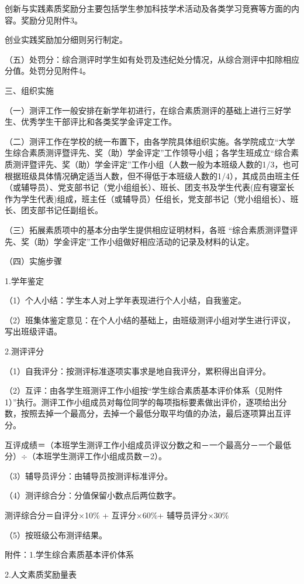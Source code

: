 \documentclass[UTF8,12pt,a4paper]{report}
\begin{document}
创新与实践素质奖励分主要包括学生参加科技学术活动及各类学习竞赛等方面的内容。奖励分见附件3。

创业实践奖励加分细则另行制定。

（五）处罚分：综合测评时学生如有处罚及违纪处分情况，从综合测评中扣除相应分值。处罚分见附件4。

三、组织实施

（一）测评工作一般安排在新学年初进行，在综合素质测评的基础上进行三好学生、优秀学生干部评比和各类奖学金评定工作。

（二）测评工作在学校的统一布置下，由各学院具体组织实施。各学院成立“大学生综合素质测评暨评先、奖（助）学金评定”工作领导小组；各学生班成立“综合素质测评暨评先、奖（助）学金评定”工作小组（人数一般为本班级人数的1/3，也可根据班级具体情况确定适当人数，但不得低于本班级人数的1/4），其成员由班主任（或辅导员）、党支部书记（党小组组长）、班长、团支书及学生代表(应有寝室长作为学生代表)组成，班主任（或辅导员）任组长，党支部书记（党小组组长）、班长、团支部书记任副组长。

（三）拓展素质项中的基本分由学生提供相应证明材料，各班 “综合素质测评暨评先、奖（助）学金评定”工作小组做好相应活动的记录及材料的认定。

（四）实施步骤

1.学年鉴定

（1）个人小结：学生本人对上学年表现进行个人小结，自我鉴定。

（2）班集体鉴定意见：在个人小结的基础上，由班级测评小组对学生进行评议，写出班级评语。

2.测评评分

（1）自我评分：按测评标准逐项实事求是地自我评分，累积得出自评分。

（2）互评：由各学生班测评工作小组按“学生综合素质基本评价体系（见附件1）”执行。测评工作小组成员对每位同学的每项指标要素做出评价，逐项给出分数，按照去掉一个最高分，去掉一个最低分取平均值的办法，最后逐项算出互评分。

互评成绩＝（本班学生测评工作小组成员评议分数之和－一个最高分－一个最低分）$\div$（本班学生测评工作小组成员数－2）。

（3）辅导员评分：由辅导员按测评标准评分。

（4）测评综合分：分值保留小数点后两位数字。

测评综合分＝自评分$\times$10\% + 互评分$\times$60\%+ 辅导员评分$\times$30\%

（5）按班级公布测评结果。

附件：1.学生综合素质基本评价体系

2.人文素质奖励量表
\end{document}
